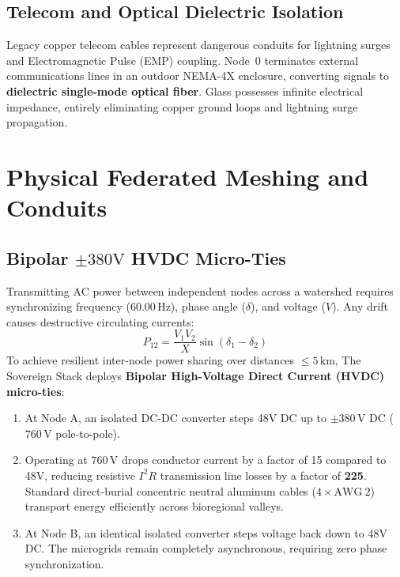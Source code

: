 \subsection{Telecom and Optical Dielectric Isolation}

Legacy copper telecom cables represent dangerous conduits for lightning surges and Electromagnetic Pulse (EMP) coupling. Node~0 terminates external communications lines in an outdoor NEMA-4X enclosure, converting signals to \textbf{dielectric single-mode optical fiber}. Glass possesses infinite electrical impedance, entirely eliminating copper ground loops and lightning surge propagation.

\section{Physical Federated Meshing and Conduits}
\label{sec:l1_meshing}

\subsection{Bipolar $\pm 380\mathrm{V}$ HVDC Micro-Ties}

Transmitting AC power between independent nodes across a watershed requires synchronizing frequency ($60.00\,\mathrm{Hz}$), phase angle ($\delta$), and voltage ($V$). Any drift causes destructive circulating currents:
\begin{equation}
P_{12} = \frac{V_1 V_2}{X} \sin(\delta_1 - \delta_2)
\label{eq:ac_intertie_power}
\end{equation}
To achieve resilient inter-node power sharing over distances $\le 5\,\mathrm{km}$, The Sovereign Stack deploys \textbf{Bipolar High-Voltage Direct Current (HVDC) micro-ties}:
\begin{enumerate}
    \item At Node A, an isolated DC-DC converter steps 48V DC up to $\pm 380\,\mathrm{V}$ DC ($760\,\mathrm{V}$ pole-to-pole).
    \item Operating at $760\,\mathrm{V}$ drops conductor current by a factor of 15 compared to 48V, reducing resistive $I^2 R$ transmission line losses by a factor of \textbf{225}. Standard direct-burial concentric neutral aluminum cables ($4\times \mathrm{AWG~2}$) transport energy efficiently across bioregional valleys.
    \item At Node B, an identical isolated converter steps voltage back down to 48V DC. The microgrids remain completely asynchronous, requiring zero phase synchronization.
\end{enumerate}

